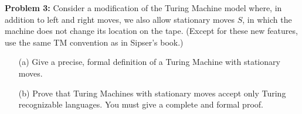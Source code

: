 
\noindent \textbf{Problem 3: } Consider a modification of the Turing Machine model where, in addition to left and right moves, we also allow stationary moves $S$, in which the machine does not change its location on the tape. (Except for these new features, use the same TM convention as in Sipser's book.)

\begin{itemize}
    \item[(a)] Give a precise, formal definition of a Turing Machine with stationary moves.
    \item[(b)]  Prove that Turing Machines with stationary moves accept only Turing recognizable languages. You must give a complete and formal proof.
\end{itemize}